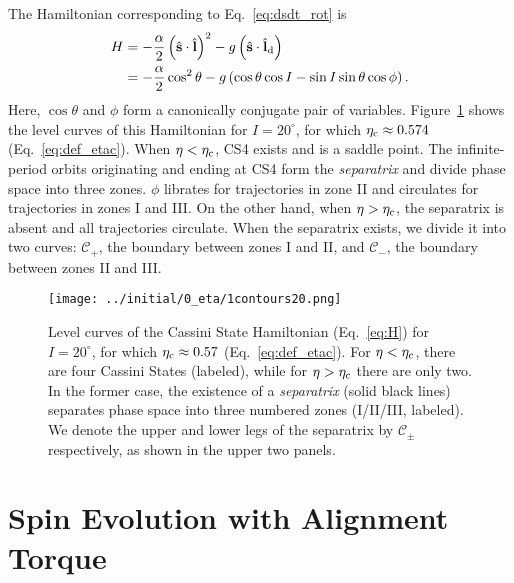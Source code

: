 \documentclass[
        fleqn,
        usenatbib,
        referee,
    ]{mnras}
\newcommand*{\p}[1]{\left(#1\right)}
\newcommand*{\uv}[1]{\hat{\boldsymbol{\mathbf{#1}}}}
\newlength{\colummwidth}
\begin{document}
The Hamiltonian corresponding to Eq.~\eqref{eq:dsdt_rot} is
\begin{align}
    H &= -\frac{\alpha}{2}\p{\uv{s} \cdot \uv{l}}^2
            - g\p{\uv{s} \cdot \uv{l}_{\rm d}}\nonumber\\
        &= -\frac{\alpha}{2} \cos^2\theta
            - g\p{\cos\theta \cos I - \sin I \sin\theta \cos \phi}.\label{eq:H}
\end{align}
Here, $\cos \theta$ and $\phi$ form a canonically conjugate pair of variables.
Figure~\ref{fig:1contours} shows the level curves of this Hamiltonian for $I =
20^\circ$, for which $\eta_{\rm c} \approx 0.574$ (Eq.~\ref{eq:def_etac}). When $\eta
< \eta_{\rm c}$, CS4 exists and is a saddle point. The infinite-period orbits
originating and ending at CS4 form the \emph{separatrix} and divide phase space
into three zones. $\phi$ librates for trajectories in zone II and circulates for
trajectories in zones I and III\@. On the other hand, when $\eta > \eta_{\rm
c}$, the separatrix is absent and all trajectories circulate. When the
separatrix exists, we divide it into two curves: $\mathcal{C}_+$, the boundary
between zones I and II, and $\mathcal{C}_-$, the boundary between zones II and
III\@.
\begin{figure}
    \centering
    \texttt{[image: ../initial/0\_eta/1contours20.png]}
    \caption{Level curves of the Cassini State Hamiltonian (Eq.~\ref{eq:H}) for
    $I = 20^\circ$, for which $\eta_{\rm c} \approx 0.57$
    (Eq.~\ref{eq:def_etac}). For $\eta < \eta_{\rm c}$, there are four Cassini
    States (labeled), while for $\eta > \eta_{\rm c}$ there are only two. In the
    former case, the existence of a \emph{separatrix} (solid black lines)
    separates phase space into three numbered zones (I/II/III, labeled). We
    denote the upper and lower legs of the separatrix by $\mathcal{C}_{\pm}$
    respectively, as shown in the upper two panels. }\label{fig:1contours}
\end{figure}

\section{Spin Evolution with Alignment Torque}\label{s:toy_model}
\end{document}
